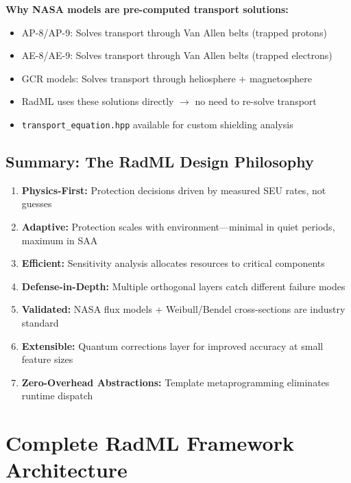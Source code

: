 \documentclass[11pt,a4paper]{article}
\begin{document}
\textbf{Why NASA models are pre-computed transport solutions:}
\begin{itemize}
    \item AP-8/AP-9: Solves transport through Van Allen belts (trapped protons)
    \item AE-8/AE-9: Solves transport through Van Allen belts (trapped electrons)
    \item GCR models: Solves transport through heliosphere + magnetosphere
    \item RadML uses these solutions directly $\to$ no need to re-solve transport
    \item \texttt{transport\_equation.hpp} available for custom shielding analysis
\end{itemize}

\subsection{Summary: The RadML Design Philosophy}

\begin{tcolorbox}[colback=blue!5!white,colframe=blue!75!black,title=Core Design Principles]
\begin{enumerate}
    \item \textbf{Physics-First:} Protection decisions driven by measured SEU rates, not guesses
    \item \textbf{Adaptive:} Protection scales with environment---minimal in quiet periods, maximum in SAA
    \item \textbf{Efficient:} Sensitivity analysis allocates resources to critical components
    \item \textbf{Defense-in-Depth:} Multiple orthogonal layers catch different failure modes
    \item \textbf{Validated:} NASA flux models + Weibull/Bendel cross-sections are industry standard
    \item \textbf{Extensible:} Quantum corrections layer for improved accuracy at small feature sizes
    \item \textbf{Zero-Overhead Abstractions:} Template metaprogramming eliminates runtime dispatch
\end{enumerate}
\end{tcolorbox}

\section{Complete RadML Framework Architecture}
\end{document}
